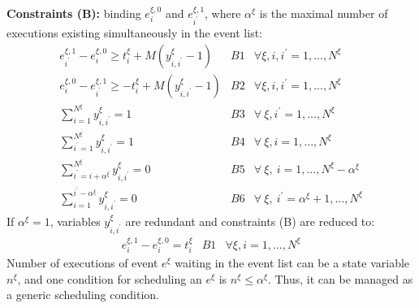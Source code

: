 \documentclass[]{interact}
\theoremstyle{plain}%
\theoremstyle{definition}
\theoremstyle{remark}
\begin{document}
\textbf{Constraints (B):} binding $e^{\xi,0}_i$ and $e^{\xi,1}_{i^{'}}$, where $\alpha^{\xi}$ is the maximal number of executions existing simultaneously in the event list:
\begin{eqnarray}
e^{\xi,1}_{i^{'}} - e^{\xi,0}_{i} \ge t^{\xi}_{i} +M(y^{\xi}_{i,i^{'}}-1) &B1& \forall \xi, i, i ^{'}=1,...,N^{\xi}\\
e^{\xi,0}_{i} - e^{\xi,1}_{i^{'}}  \ge -t^{\xi}_{i} +M(y^{\xi}_{i,i^{'}}-1) &B2& \forall \xi, i, i ^{'}=1,...,N^{\xi}\\
\sum_{i=1}^{N^{\xi}} y^{\xi}_{i,i^{'}} = 1&B3& \forall\ \xi, i^{'}=1,...,N^{\xi}\\
\sum_{i^{'}=1}^{N^{\xi}} y^{\xi}_{i,i^{'}} = 1 &B4& \forall\ \xi,i=1,...,N^{\xi}\\
\sum_{i^{'}=i+\alpha^{\xi}}^{N^{\xi}} y^{\xi}_{i,i^{'}}=0&B5& \forall\ \xi,\ i=1,...,N^{\xi}-\alpha^{\xi}\\
\sum_{i=1}^{i^{'}-\alpha^{\xi}} y^{\xi}_{i,i^{'}}=0&B6&\forall\ \xi,\ i^{'}=\alpha^{\xi}+1, ..., N^{\xi}
\end{eqnarray}
If $\alpha^{\xi}=1$, variables $y^{\xi}_{i,i^{'}}$ are redundant and constraints (B) are reduced to:
\begin{eqnarray}
e^{\xi,1}_{i} - e^{\xi,0}_{i} = t^{\xi}_{i} &B1& \forall \xi, i=1,...,N^{\xi}
\end{eqnarray}
Number of executions of event $e^{\xi}$ waiting in the event list can be a state variable $n^{\xi}$, and one condition for scheduling an $e^{\xi}$ is $n^{\xi}\le \alpha^{\xi}$. Thus, it can be managed as a generic scheduling condition.
\end{document}
